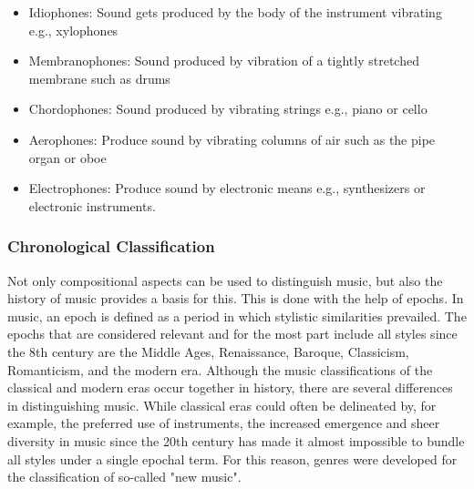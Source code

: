 \begin{itemize}
    \item Idiophones: Sound gets produced by the body of the instrument vibrating e.g., xylophones
    \item Membranophones: Sound produced by vibration of a tightly stretched membrane such as drums
    \item Chordophones: Sound produced by vibrating strings e.g., piano or cello
    \item Aerophones: Produce sound by vibrating columns of air such as the pipe organ or oboe
    \item Electrophones: Produce sound by electronic means e.g., synthesizers or electronic instruments.
\end{itemize}
\cite{GoshenInstrumentClass}

\subsubsection{Chronological Classification}

Not only compositional aspects can be used to distinguish music,
but also the history of music provides a basis for this.
This is done with the help of epochs.
In music, an epoch is defined as a period in which stylistic similarities prevailed.
The epochs that are considered relevant and for the most part include all styles since the 8th century
are the Middle Ages, Renaissance, Baroque, Classicism, Romanticism, and the modern era.\cite{LexikonMusikepochen}
Although the music classifications of the classical and modern eras occur together in history,
there are several differences in distinguishing music.
While classical eras could often be delineated by, for example, the preferred use of instruments,
the increased emergence and sheer diversity in music since the 20th century has made it almost
impossible to bundle all styles under a single epochal term.
For this reason, genres were developed for the classification of so-called "new music".\cite{MusicflxRichtungen}

